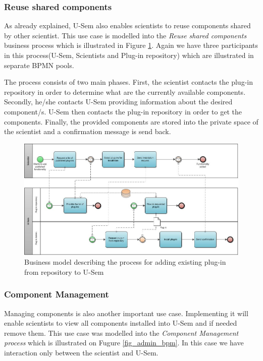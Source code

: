 \subsubsection{Reuse shared components}

As already explained, U-Sem also enables scientists to reuse components shared by other scientist. This use case is modelled into the \textit{Reuse shared components} business process which is illustrated in Figure \ref{fig_repo_bpm}. Again we have three participants in this process(U-Sem, Scientists and Plug-in repository) which are illustrated in separate BPMN pools. 

The process consists of two main phases. First, the scientist contacts the plug-in repository in order to determine what are the currently available components. Secondly, he/she contacts U-Sem providing information about the desired component/s. U-Sem then contacts the plug-in repository in order to get the components. Finally, the provided components are stored into the private space of the scientist and a confirmation message is send back.

\begin{figure}[h!]
  \centering
  	\includegraphics[scale=0.7,angle=90]{plug-in/business_processes/InstallPlugInFromRepoBusinessModel.jpg}
  \caption{Business model describing the process for adding existing plug-in from repository to U-Sem}
  \label{fig_repo_bpm}
\end{figure}

\subsubsection{Component Management}

Managing components is also another important use case. Implementing it will enable scientists to view all components installed into U-Sem and if needed remove them. This use case was modelled into the \textit{Component Management process} which is illustrated on Fugure \ref{fig_admin_bpm}. In this case we have interaction only between the scientist and U-Sem.

